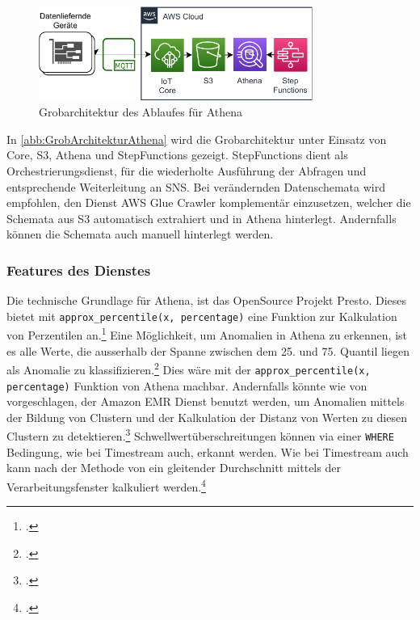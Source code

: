 \begin{figure}[H]
\centering
\includegraphics[width=0.8\textwidth]{graphics/Athena-general.pdf}
\caption{Grobarchitektur des Ablaufes für Athena}
\label{abb:GrobArchitekturAthena}
\end{figure}

In \autoref{abb:GrobArchitekturAthena} wird die Grobarchitektur unter Einsatz von \AWSIOT{} Core, \ac{S3}, Athena und StepFunctions gezeigt. StepFunctions dient als Orchestrierungsdienst, für die wiederholte Ausführung der Abfragen und entsprechende Weiterleitung an \ac{SNS}.
Bei verändernden Datenschemata wird empfohlen, den Dienst \ac{AWS} Glue Crawler komplementär einzusetzen, welcher die Schemata aus \ac{S3} automatisch extrahiert und in Athena hinterlegt. Andernfalls können die Schemata auch manuell hinterlegt werden.

\subsubsection{Features des Dienstes}
Die technische Grundlage für Athena, ist das OpenSource Projekt Presto. Dieses bietet mit \texttt{approx_percentile(x, percentage)} eine Funktion zur Kalkulation von Perzentilen an.\footcite[Vgl.][]{ThePrestoFoundation.o.J.}
Eine Möglichkeit, um Anomalien in Athena zu erkennen, ist es alle Werte, die ausserhalb der Spanne zwischen dem 25. und 75. Quantil liegen als Anomalie zu klassifizieren.\footcite[Vgl.][]{Salgado.2019} Dies wäre mit der \texttt{approx_percentile(x, percentage)} Funktion von Athena machbar. Andernfalls könnte wie von \citeauthor{Megler.2016} vorgeschlagen, der Amazon \ac{EMR} Dienst benutzt werden, um Anomalien mittels der Bildung von Clustern und der Kalkulation der Distanz von Werten zu diesen Clustern zu detektieren.\footcite[Vgl.][]{Megler.2016}
Schwellwertüberschreitungen können via einer \texttt{WHERE} Bedingung, wie bei Timestream auch, erkannt werden.
Wie bei Timestream auch kann nach der Methode von \citeauthor{Ross.2020} ein gleitender Durchschnitt mittels der Verarbeitungsfenster kalkuliert werden.\footcite[Vgl.][]{Ross.2020}

